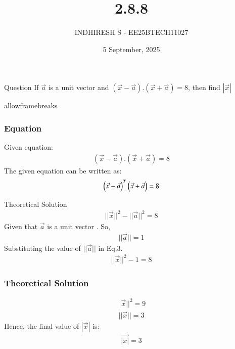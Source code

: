 \documentclass{beamer}
\title %
{2.8.8}
\date{5 September, 2025}
\author %
{INDHIRESH S - EE25BTECH11027}
\begin{document}
\frame{\titlepage}
\begin{frame}{Question}
If $\vec{a}$ is a unit vector and $(\vec{x} -\vec{a}).(\vec{x}+\vec{a}) = 8$, then find $|\vec{x}|$\\
\end{frame}
\begin{frame}{allowframebreaks}
\frametitle{Equation}

    \centering
    
    \label{tab:parameters}
Given equation:
\begin{align}
     (\vec{x} -\vec{a}).(\vec{x}+\vec{a}) = 8
\end{align}
The given equation can be written as:
\begin{align}
   \begin{pmatrix}\Vec{x}-\Vec{a}\end{pmatrix}^T\begin{pmatrix}\Vec{x}+\Vec{a}\end{pmatrix}=8
\end{align}
   
\end{frame}


\begin{frame}{Theoretical Solution}
\begin{align}
    ||\Vec{x}||^2-||\Vec{a}||^2=8
\end{align}
Given that $\Vec{a}$ is a unit vector . So,
\begin{align}
    ||\Vec{a}||=1
\end{align}
Substituting the value of $||\Vec{a}||$ in Eq.3.
\begin{align}
    ||\Vec{x}||^2-1=8
\end{align}



\end{frame}
\begin{frame}
\frametitle{Theoretical Solution}
\begin{align}
    ||\Vec{x}||^2=9
\end{align}
\begin{align}
     ||\Vec{x}||=3
\end{align}
Hence, the final value of $|\Vec{x}|$ is:
\begin{align}
    \Vec{|x|}=3
\end{align}

\end{frame}
\end{document}
